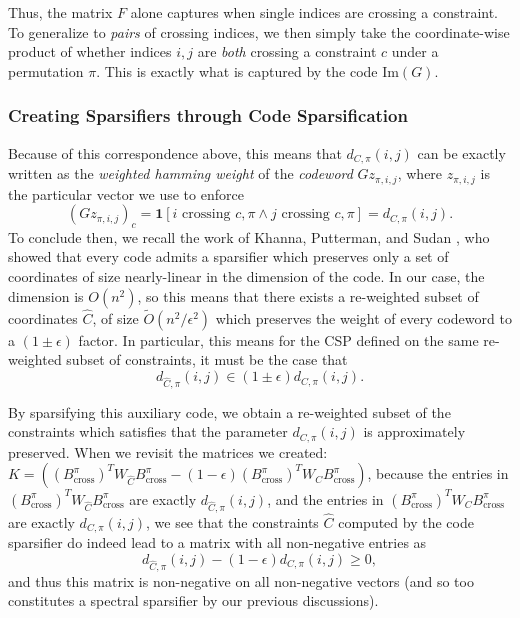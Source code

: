 \documentclass[11pt]{article}
\theoremstyle{definition}
\newcommand{\eps}{\epsilon}
\begin{document}
Thus, the matrix $F$ alone captures when single indices are crossing a constraint. To generalize to \emph{pairs} of crossing indices, we then simply take the coordinate-wise product of whether indices $i,j$ are \emph{both} crossing a constraint $c$ under a permutation $\pi$. This is exactly what is captured by the code $\mathrm{Im}(G)$.  

\subsubsection{Creating Sparsifiers through Code Sparsification}

Because of this correspondence above, this means that $d_{C, \pi}(i,j)$ can be exactly written as the \emph{weighted hamming weight} of the \emph{codeword} $G z_{\pi, i, j}$, where $z_{\pi, i, j}$ is the particular vector we use to enforce 
\[
(G z_{\pi, i, j})_c = \mathbf{1}[i \text{ crossing } c,\pi \wedge j \text{ crossing } c,\pi] = d_{C, \pi}(i,j).
\]
To conclude then, we recall the work of Khanna, Putterman, and Sudan \cite{KPS24}, who showed that every code admits a sparsifier which preserves only a set of coordinates of size nearly-linear in the dimension of the code. In our case, the dimension is $O(n^2)$, so this means that there exists a re-weighted subset of coordinates $\hat{C}$, of size $\widetilde{O}(n^2 / \eps^2)$ which preserves the weight of every codeword to a $(1 \pm \eps)$ factor. In particular, this means for the CSP defined on the same re-weighted subset of constraints, it must be the case that 
\[
d_{\hat{C}, \pi}(i,j) \in (1 \pm \eps) d_{C, \pi}(i,j).
 \]
 
 By sparsifying this auxiliary code, we obtain a re-weighted subset of the constraints which satisfies that the parameter $d_{C, \pi}(i,j)$ is approximately preserved. When we revisit the matrices we created: $K = ( (B_{\mathrm{cross}}^{\pi})^T W_{\hat{C}} B_{\mathrm{cross}}^{\pi} - (1 - \eps)(B_{\mathrm{cross}}^{\pi})^T W_{C} B_{\mathrm{cross}}^{\pi})$, because the entries in $(B_{\mathrm{cross}}^{\pi})^T W_{\hat{C}} B_{\mathrm{cross}}^{\pi}$ are exactly $d_{\hat{C}, \pi}(i,j) $, and the entries in $(B_{\mathrm{cross}}^{\pi})^T W_{C} B_{\mathrm{cross}}^{\pi}$ are exactly $d_{C, \pi}(i,j)$, we see that the constraints $\hat{C}$ computed by the code sparsifier do indeed lead to a matrix with all non-negative entries as 
 \[
 d_{\hat{C}, \pi}(i,j) - (1 - \eps )d_{C, \pi}(i,j) \geq 0,
 \]
 and thus this matrix is non-negative on all non-negative vectors (and so too constitutes a spectral sparsifier by our previous discussions).
 
\end{document}
